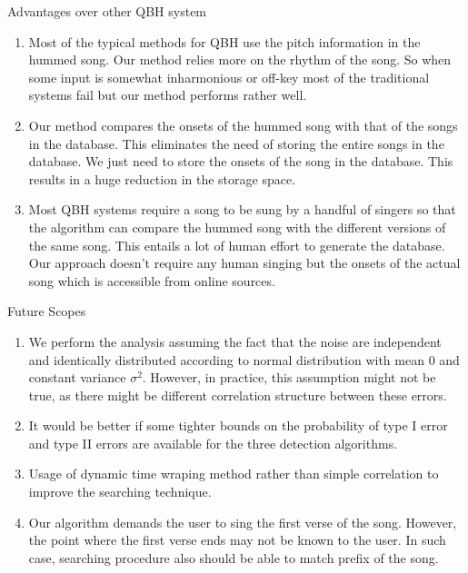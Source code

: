 \documentclass[10pt]{beamer}
\begin{document}
\begin{frame}{Advantages over other QBH system}
    \begin{enumerate}
    \item Most of the typical methods for QBH use the pitch information in the hummed song. Our method relies more on the rhythm of the song. So when some input is somewhat inharmonious or off-key most of the traditional systems fail but our method performs rather well.
    \item Our method compares the onsets of the hummed song with that of the songs in the database. This eliminates the need of storing the entire songs in the database. We just need to store the onsets of the song in the database. This results in a huge reduction in the storage space.
    \item Most QBH systems require a song to be sung by a handful of singers so that the algorithm can compare the hummed song with the different versions of the same song. This entails a lot of human effort to generate the database. Our approach doesn't require any human singing but the onsets of the actual song which is accessible from online sources.
\end{enumerate}
\end{frame}

\begin{frame}{Future Scopes}
    \begin{enumerate}
    \item We perform the analysis assuming the fact that the noise are independent and identically distributed according to normal distribution with mean $0$ and constant variance $\sigma^2$. However, in practice, this assumption might not be true, as there might be different correlation structure between these errors.
    \item It would be better if some tighter bounds on the probability of type I error and type II errors are available for the three detection algorithms.
    \item Usage of dynamic time wraping method rather than simple correlation to improve the searching technique.
    \item Our algorithm demands the user to sing the first verse of the song. However, the point where the first verse ends may not be known to the user. In such case, searching procedure also should be able to match prefix of the song.
\end{enumerate}

\end{frame}
\end{document}
